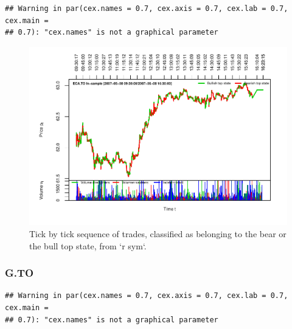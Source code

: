 \documentclass[]{article}
\begin{document}
\begin{verbatim}
## Warning in par(cex.names = 0.7, cex.axis = 0.7, cex.lab = 0.7, cex.main =
## 0.7): "cex.names" is not a graphical parameter
\end{verbatim}

\begin{figure}[H]
\includegraphics[width=\textwidth]{main_files/figure-latex/unnamed-chunk-32-1} \caption{Tick by tick sequence of trades, classified as belonging to the bear or the bull top state, from `r sym`.}\label{fig:unnamed-chunk-32}
\end{figure}

\newpage

\subsubsection{G.TO}\label{g.to}

\begin{verbatim}
## Warning in par(cex.names = 0.7, cex.axis = 0.7, cex.lab = 0.7, cex.main =
## 0.7): "cex.names" is not a graphical parameter
\end{verbatim}
\end{document}
